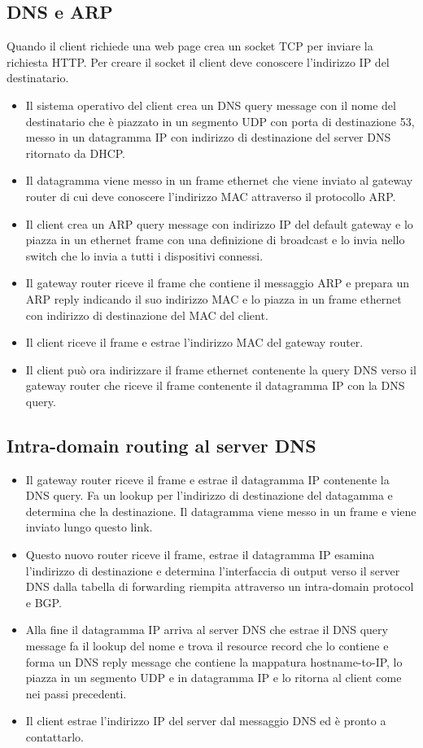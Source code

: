 \subsection{DNS e ARP}
Quando il client richiede una web page crea un socket TCP per inviare la richiesta HTTP. Per creare il socket il client deve conoscere l'indirizzo IP del destinatario.
\begin{itemize}
\item Il sistema operativo del client crea un DNS 	query message con il nome del destinatario che \`e piazzato in un segmento UDP con porta di destinazione 53, messo in un datagramma IP con indirizzo di 
destinazione del server DNS ritornato da DHCP. 
\item Il datagramma viene messo in un frame ethernet che viene inviato al gateway router di cui deve conoscere l'indirizzo MAC attraverso il protocollo ARP.
\item Il client crea un ARP query message con indirizzo IP del default gateway e lo piazza in un ethernet frame con una definizione di broadcast e lo invia nello switch che lo invia  a tutti i dispositivi connessi.
\item Il gateway router riceve il frame che contiene il messaggio ARP e prepara un ARP reply indicando il suo indirizzo MAC e lo piazza in un frame ethernet con indirizzo di destinazione del MAC del client.
\item Il client riceve il frame e estrae l'indirizzo MAC del gateway router.
\item Il client pu\`o ora indirizzare il frame ethernet contenente la query DNS verso il gateway router che riceve il frame contenente il datagramma IP con la DNS query.
\end{itemize}
\subsection{Intra-domain routing al server DNS}
\begin{itemize}
\item Il gateway router riceve il frame e estrae il datagramma IP contenente la DNS query. Fa un lookup per l'indirizzo di destinazione del datagamma e determina che la destinazione. Il datagramma viene 
messo in un frame e viene inviato lungo questo link.
\item Questo nuovo router riceve il frame, estrae il datagramma IP esamina l'indirizzo di destinazione e determina l'interfaccia di output verso il server DNS dalla tabella di forwarding riempita attraverso un
intra-domain protocol e BGP.
\item Alla fine il datagramma IP arriva al server DNS che estrae il DNS query message fa il lookup del nome  e trova il resource record che lo contiene e forma un DNS reply message che contiene la mappatura
hostname-to-IP, lo piazza in un segmento UDP e in datagramma IP e lo ritorna al client come nei passi precedenti.
\item Il client estrae l'indirizzo IP del server dal messaggio DNS ed \`e pronto a contattarlo.
\end{itemize}
